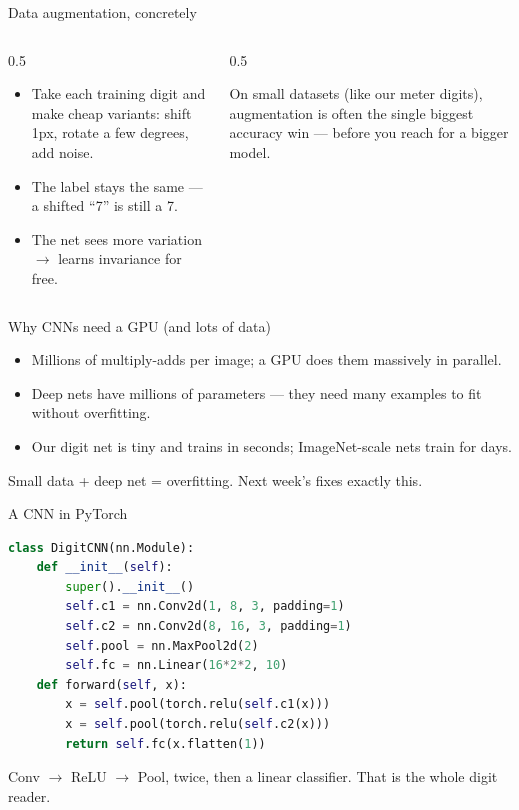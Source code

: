 \documentclass[10pt,aspectratio=169]{beamer}
\begin{document}
\begin{frame}{Data augmentation, concretely}
  \begin{columns}[T]
    \begin{column}{0.5\textwidth}
      \begin{itemize}
        \item Take each training digit and make cheap variants: shift 1px, rotate a few degrees, add noise.
        \item The label stays the same --- a shifted ``7'' is still a 7.
        \item The net sees more variation $\rightarrow$ learns invariance for free.
      \end{itemize}
    \end{column}
    \begin{column}{0.5\textwidth}
      \begin{goodbox}
        On small datasets (like our meter digits), augmentation is often the single biggest accuracy win --- before you reach for a bigger model.
      \end{goodbox}
    \end{column}
  \end{columns}
\end{frame}

\begin{frame}{Why CNNs need a GPU (and lots of data)}
  \begin{itemize}
    \item Millions of multiply-adds per image; a GPU does them massively in parallel.
    \item Deep nets have millions of parameters --- they need many examples to fit without overfitting.
    \item Our digit net is tiny and trains in seconds; ImageNet-scale nets train for days.
  \end{itemize}
  \begin{goodbox}
    Small data + deep net = overfitting. Next week's  fixes exactly this.
  \end{goodbox}
\end{frame}

\begin{frame}[fragile]{A CNN in PyTorch}
\begin{lstlisting}[language=Python]
class DigitCNN(nn.Module):
    def __init__(self):
        super().__init__()
        self.c1 = nn.Conv2d(1, 8, 3, padding=1)
        self.c2 = nn.Conv2d(8, 16, 3, padding=1)
        self.pool = nn.MaxPool2d(2)
        self.fc = nn.Linear(16*2*2, 10)
    def forward(self, x):
        x = self.pool(torch.relu(self.c1(x)))
        x = self.pool(torch.relu(self.c2(x)))
        return self.fc(x.flatten(1))
\end{lstlisting}
  Conv $\rightarrow$ ReLU $\rightarrow$ Pool, twice, then a linear classifier. That is the whole digit reader.
\end{frame}
\end{document}
